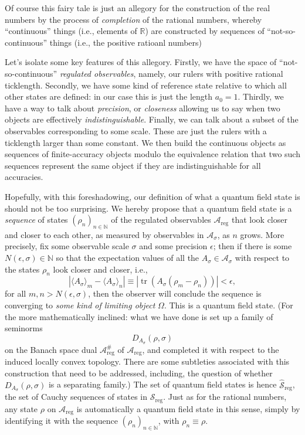 \documentclass[11pt]{amsart}
\DeclareMathOperator{\tr}{tr}
\theoremstyle{plain}%
\theoremstyle{definition}
\theoremstyle{remark}
\begin{document}
Of course this fairy tale is just an allegory for the construction of the real numbers by the process of \emph{completion} of the rational numbers, whereby ``continuous'' things (i.e., elements of $\mathbb{R}$) are constructed by sequences of ``not-so-continuous'' things (i.e., the positive ratioanl numbers)

Let's isolate some key features of this allegory. Firstly, we have the space of ``not-so-continuous'' \emph{regulated observables}, namely, our rulers with positive rational ticklength. Secondly, we have some kind of reference state relative to which all other states are defined: in our case this is just the length $a_0 = 1$. Thirdly, we have a way to talk about \emph{precision}, or \emph{closeness} allowing us to say when two objects are effectively \emph{indistinguishable}. Finally, we can talk about a subset of the observables corresponding to some scale. These are just the rulers with a ticklength larger than some constant. We then build the continuous objects as sequences of finite-accuracy objects modulo the equivalence relation that two such sequences represent the same object if they are indistinguishable for all accuracies.

Hopefully, with this foreshadowing, our definition of what a quantum field state is should not be too surprising. We hereby propose that a quantum field state is a \emph{sequence} of states $(\rho_n)_{n\in\mathbb{N}}$ of the regulated observables $\mathcal{A}_{\text{reg}}$ that look closer and closer to each other, as measured by observables in $\mathcal{A}_\sigma$, as $n$ grows. More precisely, fix some observable scale $\sigma$ and some precision $\epsilon$; then if there is some $N(\epsilon, \sigma) \in \mathbb{N}$ so that the expectation values of all the $A_\sigma\in \mathcal{A}_\sigma$ with respect to the states $\rho_n$ look closer and closer, i.e.,
\begin{equation}
	|\langle A_\sigma\rangle_m - \langle A_\sigma \rangle_n| \equiv |\tr(A_\sigma (\rho_m - \rho_n))| < \epsilon,
\end{equation}
for all $m,n>N(\epsilon,\sigma)$, then the observer will conclude the sequence is converging to \emph{some kind of limiting object} $\Omega$. This is a quantum field state. (For the more mathematically inclined: what we have done is set up a family of seminorms 
\begin{equation}
	D_{A_\sigma}(\rho, \sigma)
\end{equation}
on the Banach space dual $\mathcal{A}_{\text{reg}}^{\#}$ of $\mathcal{A}_{\text{reg}}$, and completed it with respect to the induced locally convex topology. There are some subtleties associated with this construction that need to be addressed, including, the question of whether $D_{A_\sigma}(\rho, \sigma)$ is a separating family.) The set of quantum field states is hence $\widehat{\mathcal{S}}_{\text{reg}}$, the set of Cauchy sequences of states in $\mathcal{S}_{\text{reg}}$. Just as for the rational numbers, any state $\rho$ on $\mathcal{A}_{\text{reg}}$ is automatically a quantum field state in this sense, simply by identifying it with the sequence $(\rho_n)_{n\in\mathbb{N}}$, with $\rho_n \equiv \rho$.
\end{document}
